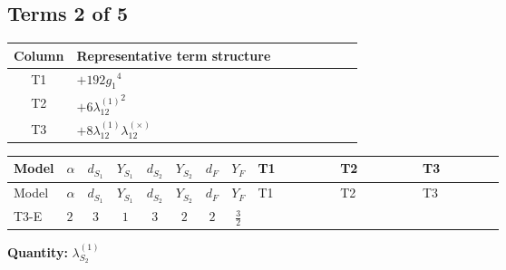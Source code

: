 \documentclass[8pt]{article}
\begin{document}
\begin{landscape}
\subsection*{Terms 2 of 5}
\begin{center}
\begin{tabular}{@{}c >{\raggedright\arraybackslash}p{0.82\linewidth}@{}}
\toprule
Column & Representative term structure \\
\midrule
T1 & \(\displaystyle +192 {g_1}^4\) \\
\midrule
T2 & \(\displaystyle +6 {\lambda_{12}^{(1)}}^2\) \\
\midrule
T3 & \(\displaystyle +8 {\lambda_{12}^{(1)}} {\lambda_{12}^{(\times)}}\) \\
\midrule
\bottomrule
\end{tabular}
\end{center}
\smallskip
\tiny
\begin{longtable}{@{}llcccccc >{\raggedright\arraybackslash}p{0.21\linewidth} >{\raggedright\arraybackslash}p{0.21\linewidth} >{\raggedright\arraybackslash}p{0.21\linewidth}@{}}
\toprule
Model & $\alpha$ & $d_{S_1}$ & $Y_{S_1}$ & $d_{S_2}$ & $Y_{S_2}$ & $d_F$ & $Y_F$ & T1 & T2 & T3 \\
\midrule
\endfirsthead
\toprule
Model & $\alpha$ & $d_{S_1}$ & $Y_{S_1}$ & $d_{S_2}$ & $Y_{S_2}$ & $d_F$ & $Y_F$ & T1 & T2 & T3 \\
\midrule
\endhead
T3-E & $2$ & $3$ & $1$ & $3$ & $2$ & $2$ & $\frac{3}{2}$ & \scriptsize\adjustbox{max width=\linewidth}{$\begin{gathered} +192 {g_1}^4\end{gathered}$} & \scriptsize\adjustbox{max width=\linewidth}{$\begin{gathered} +6 {\lambda_{12}^{(1)}}^2\end{gathered}$} & \scriptsize\adjustbox{max width=\linewidth}{$\begin{gathered} +8 {\lambda_{12}^{(1)}} {\lambda_{12}^{(\times)}}\end{gathered}$} \\
\midrule
\bottomrule
\end{longtable}
\clearpage
\noindent\textbf{Quantity: }$\lambda_{S_2}^{(1)}$\par\smallskip

\end{landscape}
\end{document}
